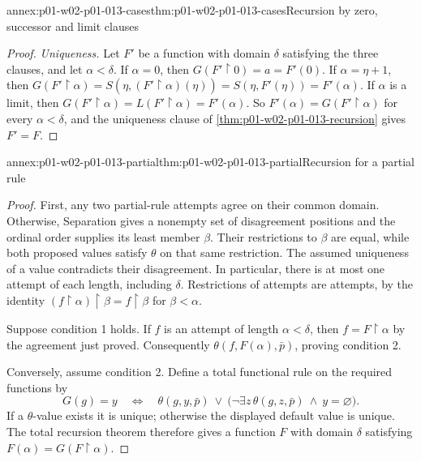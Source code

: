 \begin{annexitem}{annex:p01-w02-p01-013-cases}{thm:p01-w02-p01-013-cases}{Recursion by zero, successor and limit clauses}
\begin{proof}
\emph{Uniqueness.} Let \(F'\) be a function with domain \(\delta\)
satisfying the three clauses, and let \(\alpha<\delta\). If \(\alpha=0\),
then \(G(F'\mathbin{\upharpoonright}0)=a=F'(0)\). If \(\alpha=\eta+1\), then
\(G(F'\mathbin{\upharpoonright}\alpha)
=S(\eta,(F'\mathbin{\upharpoonright}\alpha)(\eta))=S(\eta,F'(\eta))
=F'(\alpha)\). If \(\alpha\) is a limit, then
\(G(F'\mathbin{\upharpoonright}\alpha)=L(F'\mathbin{\upharpoonright}\alpha)
=F'(\alpha)\). So \(F'(\alpha)=G(F'\mathbin{\upharpoonright}\alpha)\) for
every \(\alpha<\delta\), and the uniqueness clause of
\cref{thm:p01-w02-p01-013-recursion} gives \(F'=F\).
\end{proof}
\end{annexitem}

\begin{annexitem}{annex:p01-w02-p01-013-partial}{thm:p01-w02-p01-013-partial}{Recursion for a partial rule}
\begin{proof}
First, any two partial-rule attempts agree on their common domain. Otherwise,
Separation gives a nonempty set of disagreement positions and the ordinal
order supplies its least member \(\beta\). Their restrictions to \(\beta\)
are equal, while both proposed values satisfy \(\theta\) on that same
restriction. The assumed uniqueness of a value contradicts their disagreement.
In particular, there is at most one attempt of each length, including
\(\delta\). Restrictions of attempts are attempts, by the identity
\((f\mathbin{\upharpoonright}\alpha)\mathbin{\upharpoonright}\beta
=f\mathbin{\upharpoonright}\beta\) for \(\beta<\alpha\).

Suppose condition 1 holds. If \(f\) is an attempt of length \(\alpha<\delta\),
then \(f=F\mathbin{\upharpoonright}\alpha\) by the agreement just proved.
Consequently \(\theta(f,F(\alpha),\bar p)\), proving condition 2.

Conversely, assume condition 2. Define a total functional rule on the
required functions by
\[
 G(g)=y\quad\Longleftrightarrow\quad
 \theta(g,y,\bar p)\ \lor\
 \bigl(\neg\exists z\,\theta(g,z,\bar p)\ \land\ y=\varnothing\bigr).
\]
If a \(\theta\)-value exists it is unique; otherwise the displayed default
value is unique. The total recursion theorem therefore gives a function
\(F\) with domain \(\delta\) satisfying
\(F(\alpha)=G(F\mathbin{\upharpoonright}\alpha)\).


\end{proof}
\end{annexitem}
